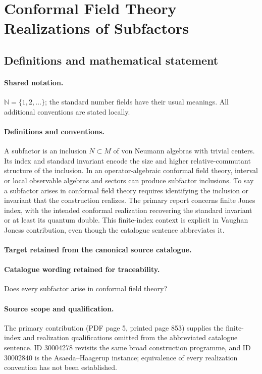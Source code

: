 \documentclass[11pt]{article}
\begin{document}
\section{Conformal Field Theory Realizations of Subfactors}\label{statement}

\subsection{Definitions and mathematical statement}

\paragraph{Shared notation.}$\mathbb N=\{1,2,\ldots\}$; the standard number fields have their usual meanings. All additional conventions are stated locally.


\paragraph{Definitions and conventions.}
A subfactor is an inclusion $N\subset M$ of von Neumann algebras with trivial centers. Its index and standard invariant encode the size and higher relative-commutant structure of the inclusion. In an operator-algebraic conformal field theory, interval or local observable algebras and sectors can produce subfactor inclusions. To say a subfactor arises in conformal field theory requires identifying the inclusion or invariant that the construction realizes. The primary report concerns finite Jones index, with the intended conformal realization recovering the standard invariant or at least its quantum double. This finite-index context is explicit in Vaughan Jones\textquotesingle s contribution, even though the catalogue sentence abbreviates it.

\paragraph{Target retained from the canonical source catalogue.}
\paragraph{Catalogue wording retained for traceability.}
Does every subfactor arise in conformal field theory?

\paragraph{Source scope and qualification.}
The primary contribution (PDF page 5, printed page 853) supplies the finite-index and realization qualifications omitted from the abbreviated catalogue sentence. ID 30004278 revisits the same broad construction programme, and ID 30002840 is the Asaeda--Haagerup instance; equivalence of every realization convention has not been established.
\end{document}
